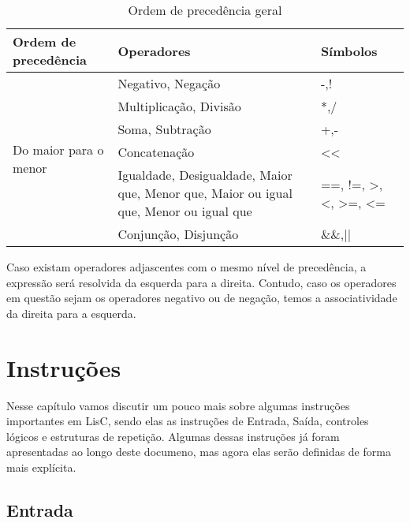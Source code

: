 \documentclass[
  12pt,				%
  oneside,			%
  a4paper,			%
  english,			%
  french,				%
  spanish,			%
  brazil,				%
]{abntex2}
\begin{document}
\begin{table}[H]
  \centering
  \begin{tabularx}{16cm}{|X|X|X|}
    \hline
    Ordem de precedência                   & Operadores & Símbolos \\ \hline
    \multirow{8}{*}{Do maior para o menor} & Negativo, Negação &  -,!\\ \cline{2-3} 
                                           & Multiplicação, Divisão & *,/ \\ \cline{2-3} 
                                           & Soma, Subtração & +,-   \\
    \cline{2-3}
                                           & Concatenação & <<   \\ \cline{2-3}
                                           & Igualdade, Desigualdade,
                                             Maior que, Menor que, Maior
                                             ou igual que, Menor ou igual
                                             que & ==, !=, >, <, >=, <=   \\ \cline{2-3}
                                           & Conjunção, Disjunção & \&\&,||   \\ \hline
  \end{tabularx}
  \caption{Ordem de precedência geral}
  \label{tab:precedencia-geral}
\end{table}

Caso existam operadores adjascentes com o mesmo nível de precedência,
a expressão será resolvida da esquerda para a direita. Contudo, caso
os operadores em questão sejam os operadores negativo ou de negação,
temos a associatividade da direita para a esquerda.


\chapter{Instruções}
\label{cha:instrucoes}

Nesse capítulo vamos discutir um pouco mais sobre algumas instruções
importantes em LisC, sendo elas as instruções de Entrada, Saída,
controles lógicos e estruturas de repetição. Algumas dessas instruções
já foram apresentadas ao longo deste documeno, mas agora elas serão
definidas de forma mais explícita.

\section{Entrada}
\label{sec:entrada}
\end{document}
